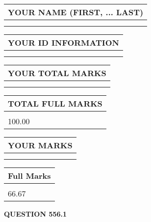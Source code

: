 \documentclass{ctexart}
\begin{document}
   
   
   
\newpage 
\setcounter{page}{ 
   556001 } 
   
   
   
   
\noindent\begin{tabular}{|l|}
\hline
YOUR NAME (FIRST, ... LAST)  \\
\hline
 \\ 
 \\ 
\hline
\end{tabular}
\hspace{0.05in} \begin{tabular}{|l|}
\hline
 YOUR   ID   INFORMATION  \\
\hline
 \\ 
 \\ 
\hline
\end{tabular}
   
   
\vspace{0.2in}\noindent\begin{tabular}{|l|}
\hline
YOUR TOTAL MARKS  \\
\hline
 \\ 
 \\ 
\hline
\end{tabular}
\hspace{0.05in} \begin{tabular}{|l|}
\hline
TOTAL FULL MARKS  \\
\hline
 \\ 
100.00 \\
\hline
\end{tabular}
   
   
 \vspace{0.2in}
 
 
 
 
   
   
  
\vspace{0.2in}
  
\noindent\begin{tabular}{|l|}
\hline
 YOUR MARKS  \\
\hline
 \\ 
 \\ 
\hline
\end{tabular}
\hspace{0.05in} \begin{tabular}{|l|}
\hline
 Full Marks  \\
\hline
 \\ 
66.67 \\
\hline
\end{tabular}
{\textbf{\Large{QUESTION
556.1 
}}}
  
\end{document}
